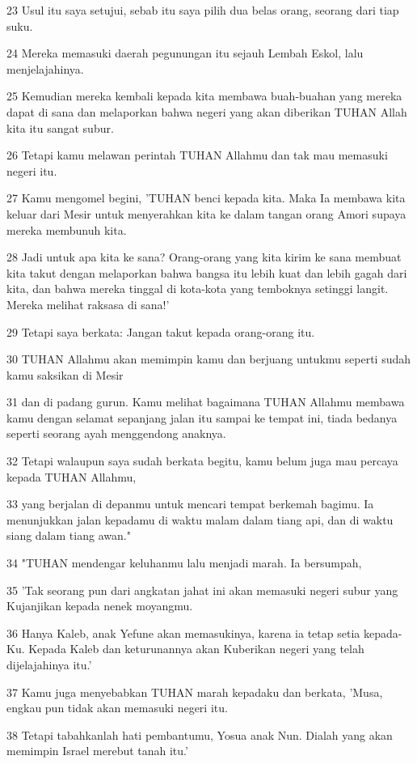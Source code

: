 \par 23 Usul itu saya setujui, sebab itu saya pilih dua belas orang, seorang dari tiap suku.
\par 24 Mereka memasuki daerah pegunungan itu sejauh Lembah Eskol, lalu menjelajahinya.
\par 25 Kemudian mereka kembali kepada kita membawa buah-buahan yang mereka dapat di sana dan melaporkan bahwa negeri yang akan diberikan TUHAN Allah kita itu sangat subur.
\par 26 Tetapi kamu melawan perintah TUHAN Allahmu dan tak mau memasuki negeri itu.
\par 27 Kamu mengomel begini, 'TUHAN benci kepada kita. Maka Ia membawa kita keluar dari Mesir untuk menyerahkan kita ke dalam tangan orang Amori supaya mereka membunuh kita.
\par 28 Jadi untuk apa kita ke sana? Orang-orang yang kita kirim ke sana membuat kita takut dengan melaporkan bahwa bangsa itu lebih kuat dan lebih gagah dari kita, dan bahwa mereka tinggal di kota-kota yang temboknya setinggi langit. Mereka melihat raksasa di sana!'
\par 29 Tetapi saya berkata: Jangan takut kepada orang-orang itu.
\par 30 TUHAN Allahmu akan memimpin kamu dan berjuang untukmu seperti sudah kamu saksikan di Mesir
\par 31 dan di padang gurun. Kamu melihat bagaimana TUHAN Allahmu membawa kamu dengan selamat sepanjang jalan itu sampai ke tempat ini, tiada bedanya seperti seorang ayah menggendong anaknya.
\par 32 Tetapi walaupun saya sudah berkata begitu, kamu belum juga mau percaya kepada TUHAN Allahmu,
\par 33 yang berjalan di depanmu untuk mencari tempat berkemah bagimu. Ia menunjukkan jalan kepadamu di waktu malam dalam tiang api, dan di waktu siang dalam tiang awan."
\par 34 "TUHAN mendengar keluhanmu lalu menjadi marah. Ia bersumpah,
\par 35 'Tak seorang pun dari angkatan jahat ini akan memasuki negeri subur yang Kujanjikan kepada nenek moyangmu.
\par 36 Hanya Kaleb, anak Yefune akan memasukinya, karena ia tetap setia kepada-Ku. Kepada Kaleb dan keturunannya akan Kuberikan negeri yang telah dijelajahinya itu.'
\par 37 Kamu juga menyebabkan TUHAN marah kepadaku dan berkata, 'Musa, engkau pun tidak akan memasuki negeri itu.
\par 38 Tetapi tabahkanlah hati pembantumu, Yosua anak Nun. Dialah yang akan memimpin Israel merebut tanah itu.'
